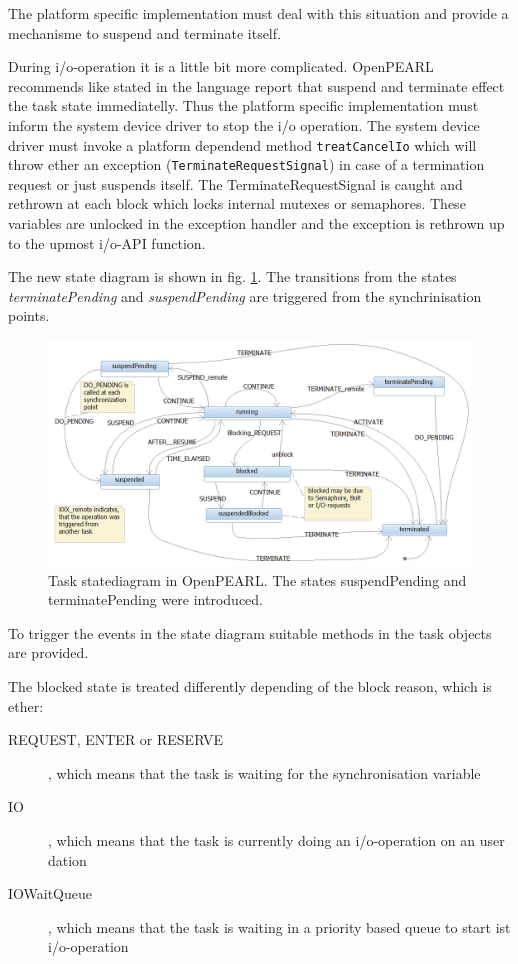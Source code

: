 The platform specific implementation must deal with this situation and
provide a mechanisme to suspend and terminate itself.

During i/o-operation it is a little bit more complicated. OpenPEARL
recommends like stated in the language report that suspend and terminate
effect the task state immediatelly. Thus the platform specific implementation
must inform the system device driver to stop the i/o operation.
The system device driver must invoke a platform dependend method
\verb|treatCancelIo| which will throw ether an exception
(\verb|TerminateRequestSignal|) in case of a termination request
 or just suspends itself.
The TerminateRequestSignal is caught and rethrown at each block which 
locks internal mutexes or semaphores. These variables are unlocked in
the exception handler and the exception is rethrown up to the upmost i/o-API
function.

The new state diagram is shown in 
fig. \ref{taskStatesOpenPEARL}.
The transitions from the  states {\em terminatePending} and 
{\em suspendPending}  are triggered from the synchrinisation points.

\begin{figure}[bpht]
\includegraphics[width=14cm]{taskStatesOpenPEARL.jpg}
\caption{Task statediagram in OpenPEARL.
The states suspendPending and terminatePending were introduced.}
\label{taskStatesOpenPEARL}
\end{figure}
To trigger the events in the state diagram suitable methods in the task 
objects are provided. 

The blocked state is treated differently depending of the block reason, which
is ether:
\begin{description}
\item[REQUEST, ENTER or RESERVE], which means that the task is waiting for 
   the synchronisation variable
\item[IO], which means that the task is currently doing an i/o-operation
   on an user dation
\item[IOWaitQueue], which means that the task is waiting in a priority based
   queue to start ist i/o-operation
\end{description}

